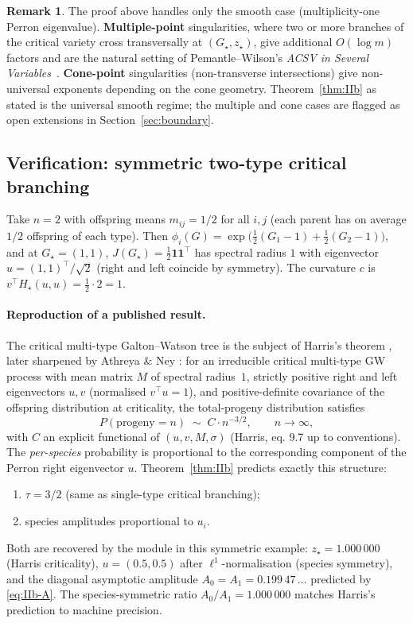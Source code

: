 \documentclass[11pt,a4paper]{article}
\theoremstyle{plain}
\theoremstyle{definition}
\newtheorem{remark}{Remark}
\begin{document}
\begin{remark}
The proof above handles only the smooth case (multiplicity-one Perron
eigenvalue).  \textbf{Multiple-point} singularities, where two or more
branches of the critical variety cross transversally at $(G_\star,
z_\star)$, give additional $O(\log m)$ factors and are the natural
setting of Pemantle--Wilson's \emph{ACSV in Several
Variables}~\citep{PemantleWilson}.  \textbf{Cone-point} singularities
(non-transverse intersections) give non-universal exponents depending
on the cone geometry.  Theorem~\ref{thm:IIb} as stated is the
universal smooth regime; the multiple and cone cases are flagged as
open extensions in Section~\ref{sec:boundary}.
\end{remark}

\subsection{Verification: symmetric two-type critical branching}

Take $n = 2$ with offspring means $m_{ij} = 1/2$ for all $i,j$ (each
parent has on average $1/2$ offspring of each type).  Then
$\phi_i(G) = \exp\bigl(\tfrac{1}{2}(G_1 - 1) + \tfrac{1}{2}(G_2 - 1)\bigr)$,
and at $G_\star = (1, 1)$, $J(G_\star) = \tfrac{1}{2}\mathbf{1}\mathbf{1}^\top$ has
spectral radius $1$ with eigenvector $u = (1,1)^\top /\sqrt{2}$ (right
and left coincide by symmetry).  The curvature $c$ is $v^\top
H_\star(u,u) = \tfrac{1}{2}\cdot 2 = 1$.

\paragraph{Reproduction of a published result.}
The critical multi-type Galton--Watson tree is the subject of
Harris's theorem \citep[Ch.~II, Thm.~9.2]{Harris1963}, later
sharpened by Athreya \& Ney \citep[Ch.~V]{AthreyaNey1972}: for an
irreducible critical multi-type GW process with mean matrix $M$ of
spectral radius~$1$, strictly positive right and left eigenvectors
$u, v$ (normalised $v^\top u = 1$), and positive-definite covariance
of the offspring distribution at criticality, the total-progeny
distribution satisfies
\[
  P(\text{progeny} = n) \;\sim\; C \cdot n^{-3/2}, \qquad n \to \infty,
\]
with $C$ an explicit functional of $(u, v, M, \sigma)$ (Harris, eq.
9.7 up to conventions).  The \emph{per-species} probability is
proportional to the corresponding component of the Perron right
eigenvector $u$.  Theorem~\ref{thm:IIb}
predicts exactly this structure:
\begin{enumerate}[label=(\arabic*), leftmargin=1.5em, itemsep=1pt]
  \item $\tau = 3/2$ (same as single-type critical branching);
  \item species amplitudes proportional to $u_i$.
\end{enumerate}
Both are recovered by the module in this symmetric example:
$z_\star = 1.000\,000$ (Harris criticality), $u = (0.5, 0.5)$ after
$\ell^1$-normalisation (species symmetry), and the diagonal
asymptotic amplitude $A_0 = A_1 = 0.199\,47\,\ldots$ predicted by
\eqref{eq:IIb-A}.
The species-symmetric ratio $A_0/A_1 = 1.000\,000$ matches Harris's
prediction to machine precision.
\end{document}
